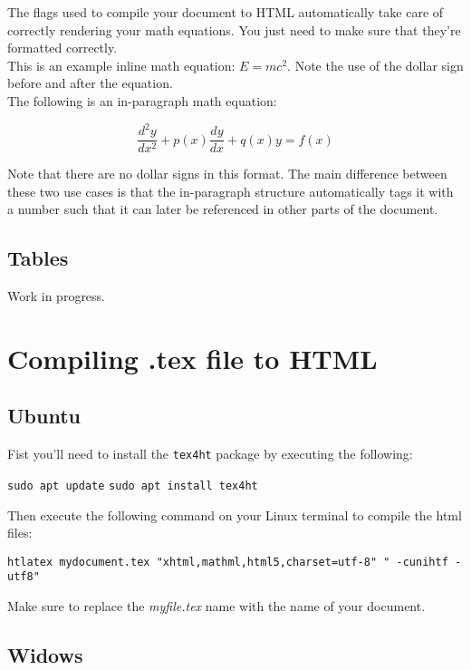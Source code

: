 \documentclass[lang=en]{article}
\newcommand{\code}[1]{\colorbox{light-gray}{\texttt{#1}}}
\begin{document}
The flags used to compile your document to HTML automatically take care of
correctly rendering your math equations. You just need to make sure that they're
formatted correctly. \\

This is an example inline math equation: $E=mc^2$. Note the use of the dollar
sign before and after the equation. \\

The following is an in-paragraph math equation:

\begin{equation}
  \frac{d^2y}{dx^2} + p(x) \frac{dy}{dx} + q(x)y = f(x)
\end{equation}

Note that there are no dollar signs in this format. The main difference between
these two use cases is that the in-paragraph structure automatically tags it
with a number such that it can later be referenced in other parts of the
document.


\subsection{Tables}

Work in progress.


\section{Compiling .tex file to HTML}
\label{sec:Compiling .tex file to HTML}

\subsection{Ubuntu}

Fist you'll need to install the \code{tex4ht} package by executing the
following:

\code{sudo apt update}
\code{sudo apt install tex4ht}

Then execute the following command on your Linux terminal to compile the html
files:

\code{htlatex mydocument.tex "xhtml,mathml,html5,charset=utf-8" " -cunihtf -utf8"}

Make sure to replace the \textit{myfile.tex} name with the name of your
document.


\subsection{Widows}
\end{document}
